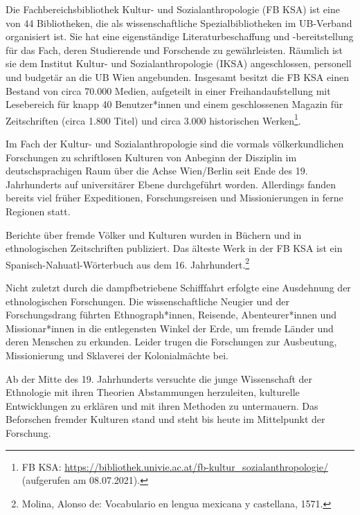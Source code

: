 \documentclass[a4paper,
fontsize=11pt,
oneside,
numbers=noperiodatend,
parskip=half-,
bibliography=totoc,
final
]{scrartcl}
\begin{document}
Die Fachbereichsbibliothek Kultur- und Sozialanthropologie (FB KSA) ist
eine von 44 Bibliotheken, die als wissenschaftliche Spezialbibliotheken
im UB-Verband organisiert ist. Sie hat eine eigenständige
Literaturbeschaffung und -bereitstellung für das Fach, deren
Studierende und Forschende zu gewährleisten. Räumlich ist sie dem
Institut Kultur- und Sozialanthropologie (IKSA) angeschlossen, personell
und budgetär an die UB Wien angebunden. Insgesamt besitzt die FB KSA
einen Bestand von circa 70.000 Medien, aufgeteilt in einer
Freihandaufstellung mit Lesebereich für knapp 40 Benutzer*innen und
einem geschlossenen Magazin für Zeitschriften (circa 1.800 Titel) und
circa 3.000 historischen Werken\footnote{FB KSA:
  \url{https://bibliothek.univie.ac.at/fb-kultur_sozialanthropologie/}
  (aufgerufen am 08.07.2021).}.

Im Fach der Kultur- und Sozialanthropologie sind die vormals
völkerkundlichen Forschungen zu schriftlosen Kulturen von Anbeginn der
Disziplin im deutschsprachigen Raum über die Achse Wien/Berlin seit Ende
des 19. Jahrhunderts auf universitärer Ebene durchgeführt worden.
Allerdings fanden bereits viel früher Expeditionen, Forschungsreisen und
Missionierungen in ferne Regionen statt.

Berichte über fremde Völker und Kulturen wurden in Büchern und in
ethnologischen Zeitschriften publiziert. Das älteste Werk in der FB KSA
ist ein Spanisch-Nahuatl-Wörterbuch aus dem 16. Jahrhundert.\footnote{Molina,
  Alonso de: Vocabulario en lengua mexicana y castellana, 1571.}

Nicht zuletzt durch die dampfbetriebene Schifffahrt erfolgte eine
Ausdehnung der ethnologischen Forschungen. Die wissenschaftliche Neugier
und der Forschungsdrang führten Ethnograph*innen, Reisende,
Abenteurer*innen und Missionar*innen in die entlegensten Winkel der
Erde, um fremde Länder und deren Menschen zu erkunden. Leider trugen die
Forschungen zur Ausbeutung, Missionierung und Sklaverei der
Kolonialmächte bei.

Ab der Mitte des 19. Jahrhunderts versuchte die junge Wissenschaft der
Ethnologie mit ihren Theorien Abstammungen herzuleiten, kulturelle
Entwicklungen zu erklären und mit ihren Methoden zu untermauern. Das
Beforschen fremder Kulturen stand und steht bis heute im Mittelpunkt der
Forschung.
\end{document}
